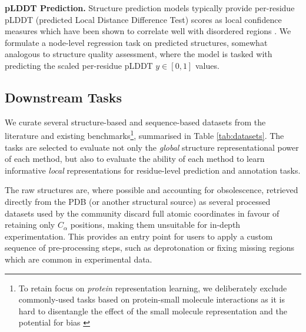 \textbf{pLDDT Prediction. } Structure prediction models typically provide per-residue pLDDT (predicted Local Distance Difference Test) scores as local confidence measures which have been shown to correlate well with disordered regions \citep{wilson2022alphafold2}. We formulate a node-level regression task on predicted structures, somewhat analogous to structure quality assessment, where the model is tasked with predicting the scaled per-residue pLDDT $y \in [0, 1]$ values.


\subsection{Downstream Tasks}
We curate several structure-based and sequence-based datasets from the literature and existing benchmarks\footnote{To retain focus on \emph{protein} representation learning, we deliberately exclude commonly-used tasks based on protein-small molecule interactions as it is hard to disentangle the effect of the small molecule representation and the potential for bias \citep{Boyles2019}}, summarised in Table \ref{tab:datasets}. The tasks are selected to evaluate not only the \emph{global} structure representational power of each method, but also to evaluate the ability of each method to learn informative \emph{local} representations for residue-level prediction and annotation tasks.

The raw structures are, where possible and accounting for obsolescence, retrieved directly from the PDB (or another structural source) as several processed datasets used by the community discard full atomic coordinates in favour of retaining only $C_\alpha$ positions, making them unsuitable for in-depth experimentation. 
This provides an entry point for users to apply a custom sequence of pre-processing steps, such as deprotonation or fixing missing regions which are common in experimental data.

